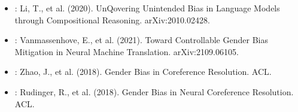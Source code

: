 \documentclass[letterpaper,10pt,english]{sphinxmanual}
\begin{document}
\begin{itemize}
\item {} 
\sphinxAtStartPar
{}: Li, T., et al. (2020). UnQovering Unintended Bias in Language Models through Compositional Reasoning. arXiv:2010.02428.

\item {} 
\sphinxAtStartPar
{}: Vanmassenhove, E., et al. (2021). Toward Controllable Gender Bias Mitigation in Neural Machine Translation. arXiv:2109.06105.

\item {} 
\sphinxAtStartPar
{}: Zhao, J., et al. (2018). Gender Bias in Coreference Resolution. ACL.

\item {} 
\sphinxAtStartPar
{}: Rudinger, R., et al. (2018). Gender Bias in Neural Coreference Resolution. ACL.

\end{itemize}
\end{document}
